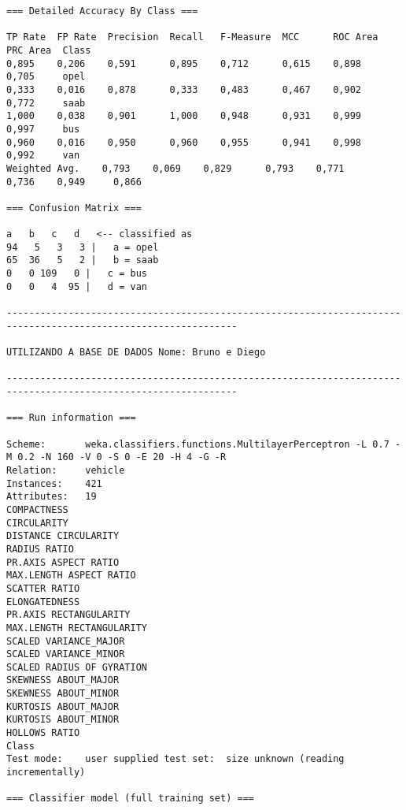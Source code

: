 \documentclass[
	article,			%
	11pt,				%
	oneside,			%
	a4paper,			%
	english,			%
	brazil,				%
	sumario=tradicional
	]{abntex2}
\begin{document}
\begin{lstlisting}
=== Detailed Accuracy By Class ===

TP Rate  FP Rate  Precision  Recall   F-Measure  MCC      ROC Area  PRC Area  Class
0,895    0,206    0,591      0,895    0,712      0,615    0,898     0,705     opel
0,333    0,016    0,878      0,333    0,483      0,467    0,902     0,772     saab
1,000    0,038    0,901      1,000    0,948      0,931    0,999     0,997     bus
0,960    0,016    0,950      0,960    0,955      0,941    0,998     0,992     van
Weighted Avg.    0,793    0,069    0,829      0,793    0,771      0,736    0,949     0,866     

=== Confusion Matrix ===

a   b   c   d   <-- classified as
94   5   3   3 |   a = opel
65  36   5   2 |   b = saab
0   0 109   0 |   c = bus
0   0   4  95 |   d = van

---------------------------------------------------------------------------------------------------------------

UTILIZANDO A BASE DE DADOS Nome: Bruno e Diego

---------------------------------------------------------------------------------------------------------------

=== Run information ===

Scheme:       weka.classifiers.functions.MultilayerPerceptron -L 0.7 -M 0.2 -N 160 -V 0 -S 0 -E 20 -H 4 -G -R
Relation:     vehicle
Instances:    421
Attributes:   19
COMPACTNESS
CIRCULARITY
DISTANCE CIRCULARITY
RADIUS RATIO
PR.AXIS ASPECT RATIO
MAX.LENGTH ASPECT RATIO
SCATTER RATIO
ELONGATEDNESS
PR.AXIS RECTANGULARITY
MAX.LENGTH RECTANGULARITY
SCALED VARIANCE_MAJOR
SCALED VARIANCE_MINOR
SCALED RADIUS OF GYRATION
SKEWNESS ABOUT_MAJOR
SKEWNESS ABOUT_MINOR
KURTOSIS ABOUT_MAJOR
KURTOSIS ABOUT_MINOR
HOLLOWS RATIO
Class
Test mode:    user supplied test set:  size unknown (reading incrementally)

=== Classifier model (full training set) ===


\end{lstlisting}
\end{document}
